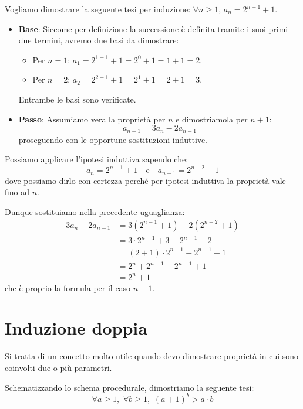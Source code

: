 \documentclass[12pt]{report}
\begin{document}
	Vogliamo dimostrare la seguente tesi per induzione: $\forall n \ge 1$, $a_n = 2^{n-1} + 1$.
	
	\begin{dimostrazione}{}{}
		\begin{itemize}
			\item \textbf{Base}: Siccome per definizione la successione è definita tramite i suoi primi due termini, avremo due basi da dimostrare:
			\begin{itemize}
				\item Per $n = 1$: $a_1 = 2^{1-1} + 1 = 2^0 + 1 = 1 + 1 = 2$.
				\item Per $n = 2$: $a_2 = 2^{2-1} + 1 = 2^1 + 1 = 2 + 1 = 3$.
			\end{itemize}
			Entrambe le basi sono verificate.
			
			\item \textbf{Passo}: Assumiamo vera la proprietà per $n$ e dimostriamola per $n+1$:
			\[
			a_{n+1} = 3a_n - 2a_{n-1}
			\]
			proseguendo con le opportune sostituzioni induttive.
		\end{itemize}
	\end{dimostrazione}
	
	Possiamo applicare l'ipotesi induttiva sapendo che:
	\[
	a_n = 2^{n-1} + 1 \quad \text{e} \quad a_{n-1} = 2^{n-2} + 1
	\]
	dove possiamo dirlo con certezza perché per ipotesi induttiva la proprietà vale fino ad $n$.
	
	Dunque sostituiamo nella precedente uguaglianza:
	\begin{align*}
		3a_n - 2a_{n-1} &= 3(2^{n-1} + 1) - 2(2^{n-2} + 1) \\
		&= 3 \cdot 2^{n-1} + 3 - 2^{n-1} - 2 \\
		&= (2 + 1) \cdot 2^{n-1} - 2^{n-1} + 1 \\
		&= 2^n + 2^{n-1} - 2^{n-1} + 1 \\
		&= 2^n + 1
	\end{align*}
	che è proprio la formula per il caso $n+1$.
	
	\section{Induzione doppia}
	
	Si tratta di un concetto molto utile quando devo dimostrare proprietà in cui sono coinvolti due o più parametri.
	
	Schematizzando lo schema procedurale, dimostriamo la seguente tesi:
	\[
	\forall a \ge 1, \,\, \forall b \ge 1, \,\, (a+1)^b > a \cdot b
	\]
	
\end{document}

